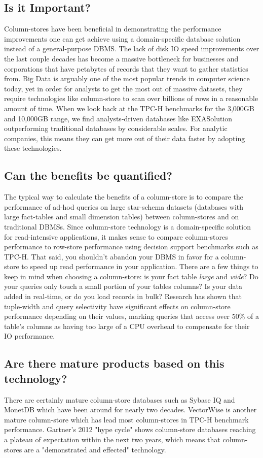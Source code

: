 \documentclass[11pt,a4paper]{report}
\begin{document}
\subsection{Is it Important?}
Column-stores have been beneficial in demonstrating the performance improvements one can get achieve using a domain-specific database solution instead of a general-purpose DBMS. The lack of disk IO speed improvements over the last couple decades has become a massive bottleneck for businesses and corporations that have petabytes of records that they want to gather statistics from. Big Data is arguably one of the most popular trends in computer science today, yet in order for analysts to get the most out of massive datasets, they require technologies like column-store to scan over billions of rows in a reasonable amount of time. When we look back at the TPC-H benchmarks for the 3,000GB and 10,000GB range, we find analysts-driven databases like EXASolution outperforming traditional databases by considerable scales. \cite{tpchbm} For analytic companies, this means they can get more out of their data faster by adopting these technologies.

\subsection{Can the benefits be quantified?}
The typical way to calculate the benefits of a column-store is to compare the performance of ad-hod queries on large star-schema datasets (databases with large fact-tables and small dimension tables) between column-stores and on traditional DBMSs. Since column-store technology is a domain-specific solution for read-intensive applications, it makes sense to compare column-stores performance to row-store performance using decision support benchmarks such as TPC-H. That said, you shouldn't abandon your DBMS in favor for a column-store to speed up read performance in your application. There are a few things to keep in mind when choosing a column-store: is your fact table \textit{large} and  \textit{wide}? Do your queries only touch a small portion of your tables columns? Is your data added in real-time, or do you load records in bulk? Research has shown that tuple-width and query selectivity have significant effects on column-store performance depending on their values, marking queries that access over 50\% of a table's columns as having too large of a CPU overhead to compensate for their IO performance. \cite{harizopoulos2006performance}

\subsection{Are there mature products based on this technology?}
There are certainly mature column-store databases such as Sybase IQ and MonetDB which have been around for nearly two decades. VectorWise is another mature column-store which has lead most column-stores in TPC-H benchmark performance. \cite{tpchbm} Gartner's 2012 "hype cycle" shows column-store databases reaching a plateau of expectation within the next two years, which means that column-stores are a "demonstrated and effected"\cite{gartnerhype} technology. 
\end{document}
